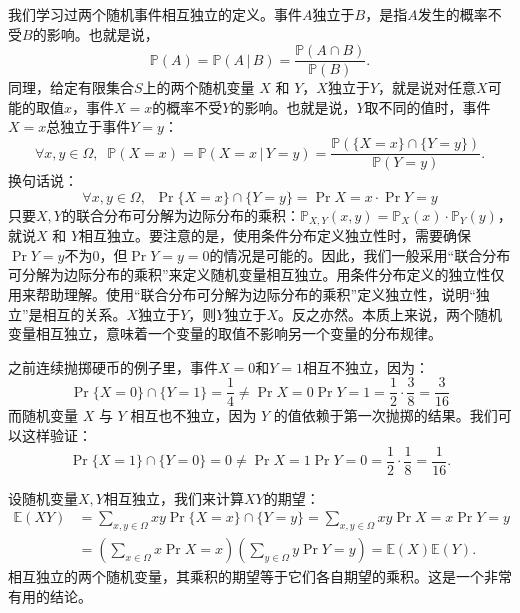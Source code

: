 \documentclass[12pt,UTF8,fontset=none]{ctexbook}
\begin{document}
我们学习过两个随机事件相互独立的定义。事件$A$独立于$B$，是指$A$发生的概率不受$B$的影响。也就是说，
$$\mathbb{P}(A) = \mathbb{P}(A \, | \, B) = \frac{\mathbb{P}(A \cap B)}{\mathbb{P}(B)}.$$
同理，给定有限集合$S$上的两个随机变量 \(X\) 和 \(Y\)，$X$独立于$Y$，就是说对任意$X$可能的取值$x$，事件$X=x$的概率不受$Y$的影响。也就是说，$Y$取不同的值时，事件$X=x$总独立于事件$Y=y$：
$$
\forall x,y \in \Omega,\;\;\mathbb{P}(X = x) = \mathbb{P}(X = x \, | \, Y = y) = \frac{\mathbb{P}(\{X = x\} \cap \{Y = y\})}{\mathbb{P}(Y = y)}.$$
换句话说：
\[
\forall x,y \in \Omega,\;\;
\Pr{\{X = x\}\cap\{Y = y\}} = \Pr{X = x} \cdot \Pr{Y = y}
\]
只要$X,Y$的联合分布可分解为边际分布的乘积：\(\mathbb{P}_{X,Y}(x,y) = \mathbb{P}_X(x) \cdot \mathbb{P}_Y(y)\)，就说\(X\) 和 \(Y\)相互独立。要注意的是，使用条件分布定义独立性时，需要确保$\Pr{Y=y}$不为$0$，但$\Pr{Y=y} = 0$的情况是可能的。因此，我们一般采用“联合分布可分解为边际分布的乘积”来定义随机变量相互独立。用条件分布定义的独立性仅用来帮助理解。使用“联合分布可分解为边际分布的乘积”定义独立性，说明“独立”是相互的关系。$X$独立于$Y$，则$Y$独立于$X$。反之亦然。本质上来说，两个随机变量相互独立，意味着一个变量的取值不影响另一个变量的分布规律。

\begin{ex}
之前连续抛掷硬币的例子里，事件$X=0$和$Y=1$相互不独立，因为：
\[
\Pr{\{X=0\}\cap\{Y=1\}} = \frac{1}{4} \neq \Pr{X=0}\Pr{Y=1} = \frac{1}{2} \cdot \frac{3}{8} = \frac{3}{16}
\]
而随机变量 \(X\) 与 \(Y\) 相互也不独立，因为 \(Y\) 的值依赖于第一次抛掷的结果。我们可以这样验证：
\[
\Pr{\{X=1\}\cap\{Y=0\}} = 0 \neq \Pr{X=1}\Pr{Y=0} = \frac{1}{2} \cdot \frac{1}{8} = \frac{1}{16}.
\]
\end{ex}

设随机变量$X,Y$相互独立，我们来计算$XY$的期望：
\begin{align*}
\mathbb{E}(XY) &= \sum_{x,y\in \Omega} xy \Pr{\{X=x\}\cap\{Y=y\}} = \sum_{x,y\in \Omega} xy \Pr{X=x} \Pr{Y=y} \\
&= \left(\sum_{x\in \Omega} x \Pr{X=x}\right) \left(\sum_{y\in \Omega} y \Pr{Y=y}\right) = \mathbb{E}(X) \mathbb{E}(Y).
\end{align*}
相互独立的两个随机变量，其乘积的期望等于它们各自期望的乘积。这是一个非常有用的结论。
\end{document}
